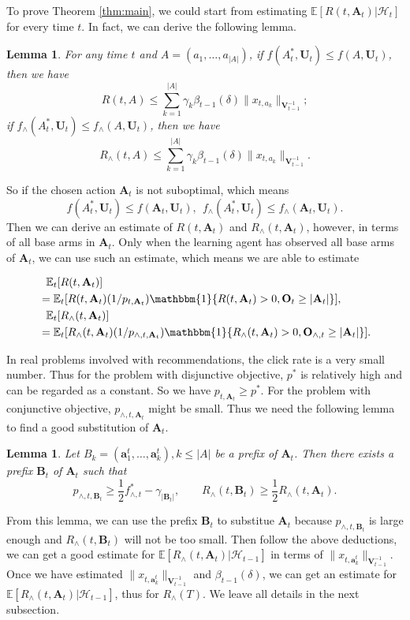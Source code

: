 \documentclass{article}
\newcommand{\EE}{\mathbb{E}}
\newcommand{\bOne}{\mathbbm{1}}
\newcommand{\bA}{\mathbf{A}}
\newcommand{\ba}{\mathbf{a}}
\newcommand{\bB}{\mathbf{B}}
\newcommand{\bO}{\mathbf{O}}
\newcommand{\bU}{\mathbf{U}}
\newcommand{\bV}{\mathbf{V}}
\newcommand{\cH}{\mathcal{H}}
\newcommand{\abs}[1]{\left| #1 \right|}
\newcommand{\norm}[1]{\| #1 \|}
\newtheorem{lemma}[theorem]{Lemma}%
\newcommand{\wei}[1]{}
\newcommand{\wei}[1]{{\color{blue!50!black}  [\text{Wei:} #1]}}
\begin{document}
\wei{I do not see the purpose of putting Lemma 4.4 and 4.5 in this section. Perhaps
	they should all be moved to Section 4.3}

To prove Theorem \ref{thm:main}, we could start from estimating $\EE[R(t, \bA_t)|\cH_t]$ for every time $t$. In fact, we can derive the following lemma.
\begin{lemma}
\label{lem:DeltaEstimate}
For any time $t$ and $A = (a_1, \ldots, a_{\abs{A}})$, if $f(A_t^*, \bU_t) \leq f(A, \bU_t)$, then we have
$$
R(t,A) \leq \sum_{k=1}^{\abs{A}} \gamma_k \beta_{t-1}(\delta)\norm{x_{t,a_k}}_{\bV_{t-1}^{-1}};
$$
if $f_{\wedge}(A_t^*, \bU_t) \leq f_{\wedge}(A, \bU_t)$, then we have
$$
R_{\wedge}(t, A) \leq \sum_{k=1}^{\abs{A}} \gamma_k \beta_{t-1}(\delta)\norm{x_{t,a_k}}_{\bV_{t-1}^{-1}}.
$$
\end{lemma}

So if the chosen action $\bA_t$ is not suboptimal, which means
$$
f(A_t^*, \bU_t) \leq f(\bA_t, \bU_t), ~~ f_{\wedge}(A_t^*, \bU_t) \leq f_{\wedge}(\bA_t, \bU_t).
$$
Then we can derive an estimate of $R(t, \bA_t)$ and $R_{\wedge}(t, \bA_t)$, however, in terms of all base arms in $\bA_t$. Only when the learning agent has observed all base arms of $\bA_t$, we can use such an estimate, which means we are able to estimate

\wei{I do not understand the above paragraph and the formula below.}
\begin{align*}
&~~\EE_t[R(t, \bA_t)] \\
&= \EE_t[R(t, \bA_t)(1/p_{t, \bA_t}) \bOne\{R(t, \bA_t) > 0, \bO_t \geq \abs{\bA_t}\}],\\
&~~\EE_t[R_{\wedge}(t, \bA_t)] \\
&= \EE_t[R_{\wedge}(t, \bA_t)(1/p_{\wedge, t, \bA_t}) \bOne\{R_{\wedge}(t, \bA_t) > 0, \bO_{\wedge, t} \geq \abs{\bA_t}\}].
\end{align*}

In real problems involved with recommendations, the click rate is a very small number. Thus for the problem with disjunctive objective, $p^*$ is relatively high and can be regarded as a constant. So we have $p_{t, \bA_t} \geq p^*$. For the problem with conjunctive objective, $p_{\wedge, t, \bA_t}$ might be small. Thus we need the following lemma to find a good substitution of $\bA_t$.

\begin{lemma}
\label{lem:prefixExist}
Let $B_k = (\ba_1^t, \ldots, \ba_k^t), k \leq \abs{A}$ be a prefix of $\bA_t$. Then there exists a prefix $\bB_t$ of $\bA_t$ such that
$$
p_{\wedge, t, \bB_t} \geq \frac{1}{2} f_{\wedge, t}^* - \gamma_{\abs{\bB_t}}, \qquad R_{\wedge}(t, \bB_t) \geq \frac{1}{2} R_{\wedge}(t, \bA_t).
$$
\end{lemma}
From this lemma, we can use the prefix $\bB_t$ to substitue $\bA_t$ because $p_{\wedge, t, \bB_t}$ is large enough and $R_{\wedge}(t, \bB_t)$ will not be too small. Then follow the above deductions, we can get a good estimate for $\EE[R_{\wedge}(t, \bA_t)|\cH_{t-1}]$ in terms of $\norm{x_{t,\ba_k^t}}_{\bV_{t-1}^{-1}}$. Once we have estimated $\norm{x_{t,\ba_k^t}}_{\bV_{t-1}^{-1}}$ and $\beta_{t-1}(\delta)$, we can get an estimate for $\EE[R_{\wedge}(t, \bA_t)|\cH_{t-1}]$, thus for $R_{\wedge}(T)$. We leave all details in the next subsection.
\end{document}
